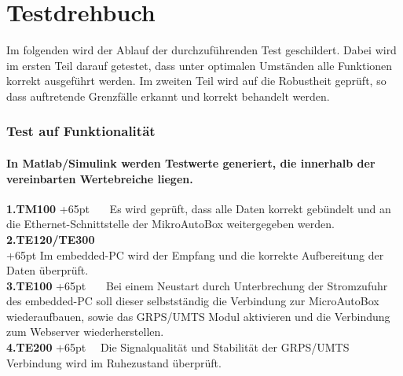 \documentclass[fontsize = 12pt, paper = a4]{scrreprt}
\begin{document}








\chapter*{Testdrehbuch}
Im folgenden wird der Ablauf der durchzuführenden Test geschildert. Dabei wird im ersten Teil darauf getestet, dass unter optimalen Umständen alle Funktionen korrekt ausgeführt werden. Im zweiten Teil wird auf die Robustheit geprüft, so dass auftretende Grenzfälle erkannt und korrekt behandelt werden.


\subsection*{Test auf Funktionalität}
\subsubsection*{In Matlab/Simulink werden Testwerte generiert, die innerhalb der vereinbarten Wertebreiche liegen.} 



\textbf{1.TM100}
\hangindent+65pt 
\ \ \  Es wird geprüft, dass alle Daten korrekt gebündelt und an die Ethernet-Schnittstelle der MikroAutoBox weitergegeben werden. \\

\textbf{2.TE120/TE300}\\
\hangindent+65pt 
Im embedded-PC wird der Empfang und die korrekte Aufbereitung der Daten überprüft.\\

\textbf{3.TE100}
\hangindent+65pt  
\ \ \ Bei einem Neustart durch Unterbrechung der Stromzufuhr des embedded-PC soll dieser selbstständig die Verbindung zur MicroAutoBox wiederaufbauen, sowie das GRPS/UMTS Modul aktivieren und die Verbindung zum Webserver wiederherstellen.\\

\textbf{4.TE200}
\hangindent+65pt  
\ \  Die Signalqualität und Stabilität der GRPS/UMTS Verbindung wird im Ruhezustand überprüft.\\
\end{document}
